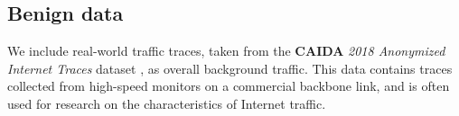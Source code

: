 \documentclass[runningheads,11pt]{llncs}\usepackage[]{graphicx}\usepackage[]{color}
\begin{document}



 
\subsection{Benign data}


We include real-world traffic traces, taken from the \textbf{CAIDA} \textit{2018 Anonymized Internet Traces} dataset \cite{CAIDA2018}, as overall background traffic. This data contains traces collected from high-speed monitors on a commercial backbone link, and is often used for research on the characteristics of Internet traffic.%
\end{document}
